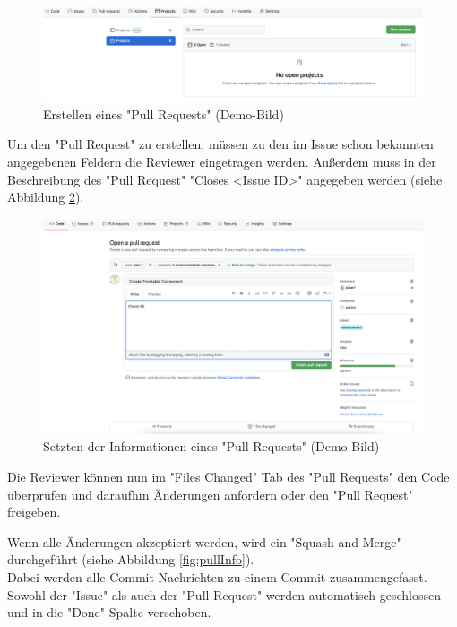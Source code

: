 \begin{figure}[H]
    \centering
    \includegraphics[width=\textwidth]{media/ProjectManagement/CreateProject.png}
    \caption{Erstellen eines "Pull Requests" (Demo-Bild)}
    \label{fig:createPullRequest}
\end{figure}

Um den "Pull Request" zu erstellen, müssen zu den im Issue schon bekannten angegebenen Feldern die Reviewer eingetragen werden. Außerdem muss in der Beschreibung des "Pull Request" "Closes \textless Issue ID\textgreater" angegeben werden (siehe Abbildung \ref{fig:EnterPullRequestInfo}).

\begin{figure}[H]
    \centering
    \includegraphics[width=\textwidth]{media/ProjectManagement/EnterPullInfo.png}
    \caption{Setzten der Informationen eines "Pull Requests" (Demo-Bild)}
    \label{fig:EnterPullRequestInfo}
\end{figure}

Die Reviewer können nun im "Files Changed" Tab des "Pull Requests" den Code überprüfen und daraufhin Änderungen anfordern oder den "Pull Request" freigeben. 

Wenn alle Änderungen akzeptiert werden, wird ein "Squash and Merge" durchgeführt (siehe Abbildung \ref{fig:pullInfo}). \\ Dabei werden alle Commit-Nachrichten  zu einem Commit zusammengefasst. Sowohl der "Issue" als auch der "Pull Request" werden automatisch geschlossen und in die "Done"-Spalte verschoben.
\cite{GithubFS}

